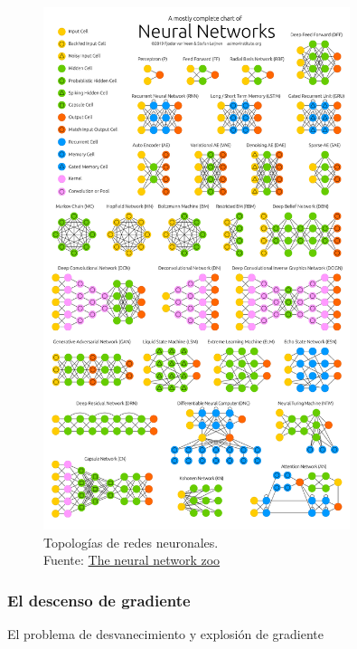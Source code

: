 \begin{figure}[H]
    \centering
    \includegraphics[width=0.8\textwidth]{figures/NeuralNetworkZo19High.png}
    \caption{Topologías de redes neuronales.\\Fuente: \href{https://www.asimovinstitute.org/neural-network-zoo/}{The neural network zoo}}
    \label{fig:NeuralNetworkZo19High}
\end{figure}


\subsubsection{El descenso de gradiente \label{gradient-descent}}
El problema de desvanecimiento y explosión de gradiente



